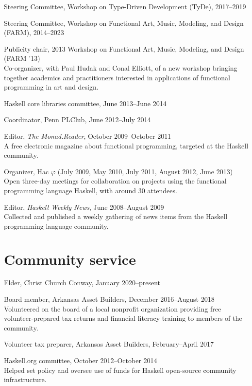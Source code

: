 \documentclass[12pt]{article}
\newcommand{\cvitem}{\par\hangpara{2em}{1}}
\begin{document}
\cvitem Steering Committee, Workshop on Type-Driven Development
(TyDe), 2017--2019

\cvitem Steering Committee, Workshop on Functional Art, Music,
Modeling, and Design (FARM), 2014--2023

\cvitem Publicity chair, 2013 Workshop on Functional Art, Music,
  Modeling, and Design (FARM '13) \\
  Co-organizer, with Paul Hudak and Conal Elliott, of a new workshop
  bringing together academics and practitioners interested in
  applications of functional programming in art and design.

\cvitem Haskell core libraries committee, June 2013--June 2014

\cvitem Coordinator, Penn PLClub, June 2012--July 2014

\cvitem Editor, \emph{The Monad.Reader}, October 2009--October 2011 \\
A free electronic magazine about functional programming, targeted at
the Haskell community.

\cvitem Organizer, Hac $\varphi$ (July 2009, May 2010, July 2011,
August 2012, June 2013) \\
Open three-day meetings for collaboration on projects using the functional
programming language Haskell, with around 30 attendees.

\cvitem Editor, \emph{Haskell Weekly News}, June 2008--August 2009 \\
Collected and published a weekly gathering of news items from the
Haskell programming language community.

\section*{Community service}

\cvitem Elder, Christ Church Conway, January 2020--present

\cvitem Board member, Arkansas Asset Builders, December
2016--August 2018 \\
Volunteered on the board of a local nonprofit organization providing
free volunteer-prepared tax returns and financial literacy training to
members of the community.

\cvitem Volunteer tax preparer, Arkansas Asset Builders,
February--April 2017

\cvitem Haskell.org committee, October 2012--October 2014 \\
Helped set policy and oversee use of funds for Haskell open-source
community infrastructure.
\end{document}
